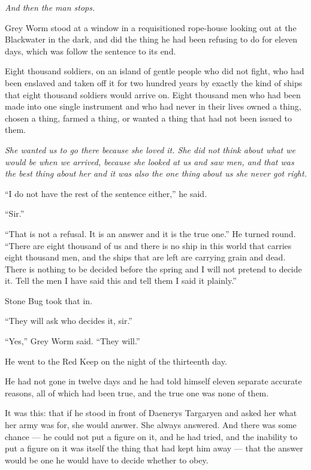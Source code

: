 \textit{And then the man stops.}

Grey Worm stood at a window in a requisitioned rope-house looking out at the Blackwater in the dark, and did the thing he had been refusing to do for eleven days, which was follow the sentence to its end.

Eight thousand soldiers, on an island of gentle people who did not fight, who had been enslaved and taken off it for two hundred years by exactly the kind of ships that eight thousand soldiers would arrive on. Eight thousand men who had been made into one single instrument and who had never in their lives owned a thing, chosen a thing, farmed a thing, or wanted a thing that had not been issued to them.

\textit{She wanted us to go there because she loved it. She did not think about what we would be when we arrived, because she looked at us and saw men, and that was the best thing about her and it was also the one thing about us she never got right.}

“I do not have the rest of the sentence either,” he said.

“Sir.”

“That is not a refusal. It is an answer and it is the true one.” He turned round. “There are eight thousand of us and there is no ship in this world that carries eight thousand men, and the ships that are left are carrying grain and dead. There is nothing to be decided before the spring and I will not pretend to decide it. Tell the men I have said this and tell them I said it plainly.”

Stone Bug took that in.

“They will ask who decides it, sir.”

“Yes,” Grey Worm said. “They will.”

\sceneBreak

He went to the Red Keep on the night of the thirteenth day.

He had not gone in twelve days and he had told himself eleven separate accurate reasons, all of which had been true, and the true one was none of them.

It was this: that if he stood in front of Daenerys Targaryen and asked her what her army was for, she would answer. She always answered. And there was some chance — he could not put a figure on it, and he had tried, and the inability to put a figure on it was itself the thing that had kept him away — that the answer would be one he would have to decide whether to obey.

